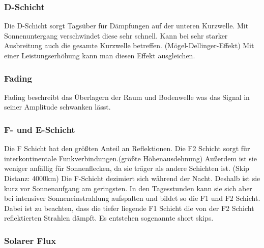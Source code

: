 \documentclass[fontzize=12pt,paper=a4,twoside=false]{article}
\begin{document}
\subsubsection[]{D-Schicht}
Die D-Schicht sorgt Tagsüber für Dämpfungen auf der unteren Kurzwelle. Mit Sonnenuntergang verschwindet diese sehr schnell. Kann bei sehr starker Ausbreitung auch die gesamte Kurzwelle betreffen. 
(Mögel-Dellinger-Effekt) Mit einer Leistungserhöhung kann man diesen Effekt ausgleichen.

\subsubsection[]{Fading}
Fading beschreibt das Überlagern der Raum und Bodenwelle was das Signal in seiner Amplitude schwanken lässt.
\subsubsection[]{F- und E-Schicht}
Die F Schicht hat den größten Anteil an Reflektionen. \newline
Die F2 Schicht sorgt für interkontinentale Funkverbindungen.(größte Höhenausdehnung) Außerdem ist sie weniger anfällig für Sonnenflecken, da sie träger als andere Schichten ist. (Skip Distanz: 4000km)
\newline 
Die F-Schicht dezimiert sich während der Nacht. Deshalb ist sie kurz vor Sonnenaufgang am geringsten. In den Tagesstunden kann sie sich aber bei intensiver Sonneneinstrahlung aufspalten und bildet so die F1 und F2 Schicht.
Dabei ist zu beachten, dass die tiefer liegende F1 Schicht die von der F2 Schicht reflektierten Strahlen dämpft. Es entstehen sogenannte \dq short skips\dq.


\subsubsection[]{Solarer Flux}
\end{document}
